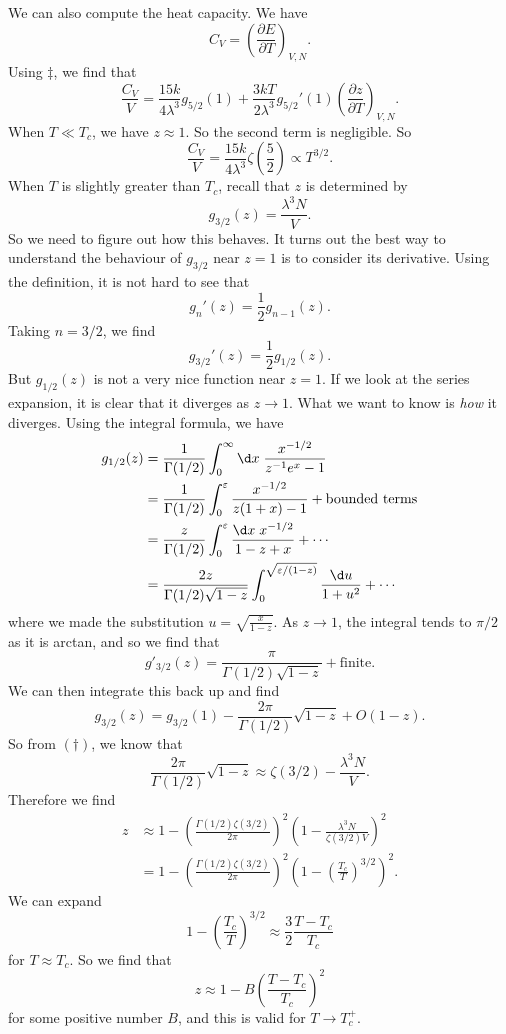 \documentclass[a4paper]{article}
\begin{document}
We can also compute the heat capacity. We have
\[
  C_V = \left(\frac{\partial E}{\partial T}\right)_{V, N}.
\]
Using $\ddagger$, we find that
\[
  \frac{C_V}{V} = \frac{15k}{4 \lambda^3} g_{5/2}(1) + \frac{3kT}{2\lambda^3} g_{5/2}'(1) \left(\frac{\partial z}{\partial T}\right)_{V, N}.
\]
When $T \ll T_c$, we have $z \approx 1$. So the second term is negligible. So
\[
  \frac{C_V}{V} = \frac{15k}{4\lambda^3} \zeta\left(\frac{5}{2}\right) \propto T^{3/2}.
\]
When $T$ is slightly greater than $T_c$, recall that $z$ is determined by
\[
  g_{3/2}(z) = \frac{\lambda^3 N}{V}.
\]
So we need to figure out how this behaves. It turns out the best way to understand the behaviour of $g_{3/2}$ near $z = 1$ is to consider its derivative. Using the definition, it is not hard to see that
\[
  g_n'(z) = \frac{1}{2} g_{n - 1}(z).
\]
Taking $n = 3/2$, we find
\[
  g_{3/2}'(z) = \frac{1}{2} g_{1/2}(z).
\]
But $g_{1/2}(z)$ is not a very nice function near $z = 1$. If we look at the series expansion, it is clear that it diverges as $z \to 1$. What we want to know is \emph{how} it diverges. Using the integral formula, we have
\begin{align*}
  g_{1/2}(z) &= \frac{1}{\Gamma(1/2)} \int_0^\infty \d x\; \frac{x^{-1/2}}{z^{-1}e^x - 1} \\
  &= \frac{1}{\Gamma(1/2)} \int_0^\varepsilon \frac{x^{-1/2}}{z(1 + x) - 1} + \text{bounded terms}\\
  &= \frac{z}{\Gamma(1/2)} \int_0^\varepsilon \frac{\d x\; x^{-1/2}}{1 - z + x} + \cdots\\
  &= \frac{2z}{\Gamma(1/2)\sqrt{1 - z}} \int_0^{\sqrt{\varepsilon/(1 - z)}} \frac{\d u}{1 + u^2} + \cdots
\end{align*}
where we made the substitution $u = \sqrt{\frac{x}{1 - z}}$. As $z \to 1$, the integral tends to $\pi/2$ as it is arctan, and so we find that
\[
  g'_{3/2}(z) = \frac{\pi}{\Gamma(1/2)\sqrt{1 - z}} + \text{finite}.
\]
We can then integrate this back up and find
\[
  g_{3/2}(z) = g_{3/2}(1) - \frac{2\pi}{\Gamma(1/2)} \sqrt{1 - z} + O(1 - z).
\]
So from $(\dagger)$, we know that
\[
  \frac{2\pi}{\Gamma(1/2)} \sqrt{1 - z} \approx \zeta(3/2) - \frac{\lambda^3 N}{V}.
\]
Therefore we find
\begin{align*}
  z &\approx 1 - \left(\frac{\Gamma(1/2) \zeta(3/2)}{2\pi}\right)^2 \left(1 - \frac{\lambda^3 N}{\zeta(3/2) V}\right)^2 \\
  &= 1 - \left(\frac{\Gamma(1/2) \zeta(3/2)}{2\pi}\right)^2 \left(1 - \left(\frac{T_c}{T}\right)^{3/2}\right)^2.
\end{align*}
We can expand
\[
  1 - \left(\frac{T_c}{T}\right)^{3/2} \approx \frac{3}{2} \frac{T - T_c}{T_c}
\]
for $T \approx T_c$. So we find that
\[
  z \approx 1 - B \left(\frac{T - T_c}{T_c}\right)^2
\]
for some positive number $B$, and this is valid for $T \to T_c^+$.
\end{document}
